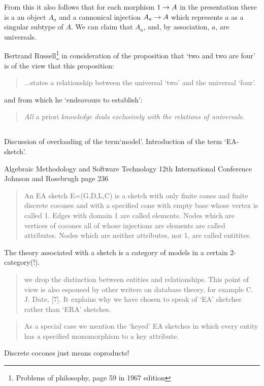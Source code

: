 \documentclass[10pt,a4paper]{scrartcl}
\begin{document}
From this it also follows that for each  morphism $1 \rightarrow A$ in the presentation there is a an object
$A_a$ and a cannonical injection $A_a \rightarrow A$ which represents $a$ as a singular subtype of $A$. We can claim that
$A_a$, and, by association, $a$, are universals. 

Bertrand Russell\footnote{Problems of philosophy, page 59 in 1967 edition} in consideration of the proposition
that `two and two are four' is of the view that this proposition:
\begin{quote}
...states a relationship between the universal `two' and the universal `four'.
\end{quote}
and from which he `endeavours to establish':
\begin{quote}
\textit{All} a priori \textit{knowledge deals exclusively with the relations of universals.}
\end{quote}

\subsection{\cite{johnson2002REL} }

\subsection{\cite{Johnson2002ERA} }
Discussion of overloading of the term`model'.
Introduction of the term `EA-sketch'. 


Algebraic Methodology and Software Technology 12th International Conference Johnson and Rosebrugh page 236
\begin{quote}
An EA sketch E=(G,D,L,C) is a sketch with only finite cones and finite discrete cocones and with a 
specified cone with empty base whose vertex is called 1. Edges with domain 1 are called elements. 
Nodes which are vertices of cocones all of whose injections are elements are called attributes. 
Nodes which are neither attributes, nor 1, are called entitites.
\end{quote}
The theory associated with a sketch is a category of models in a certain 2-category(!).
\begin{quote}
we drop the distinction between entities and relationships. This point of view is also
espoused by other writers on database theory, for example C. J. Date, [7]. It explains
why we have chosen to speak of `EA' sketches rather than `ERA' sketches.
\end{quote}
\begin{quote}
As a special case we mention the `keyed' EA sketches in which every entity has
a specified monomorphism to a key attribute.
\end{quote}
Discrete cocones just means coproducts!
\end{document}
